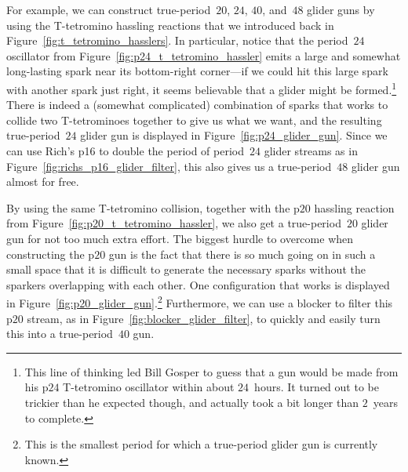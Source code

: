 For example, we can construct true-period~$20$, $24$, $40$, and~$48$ glider guns by using the T-tetromino hassling reactions that we introduced back in Figure~\ref{fig:t_tetromino_hasslers}. In particular, notice that the period~$24$ oscillator from Figure~\ref{fig:p24_t_tetromino_hassler} emits a large and somewhat long-lasting spark near its bottom-right corner---if we could hit this large spark with another spark just right, it seems believable that a glider might be formed.\footnote{This line of thinking led Bill Gosper to guess that a gun would be made from his p$24$ T-tetromino oscillator within about $24$~hours. It turned out to be trickier than he expected though, and actually took a bit longer than $2$~years to complete.} There is indeed a (somewhat complicated) combination of sparks that works to collide two T-tetrominoes together to give us what we want, and the resulting true-period~$24$ glider gun is displayed in Figure~\ref{fig:p24_glider_gun}. Since we can use Rich's p16 to double the period of period~$24$ glider streams as in Figure~\ref{fig:richs_p16_glider_filter}, this also gives us a true-period~$48$ glider gun almost for free.

By using the same T-tetromino collision, together with the p$20$ hassling reaction from Figure~\ref{fig:p20_t_tetromino_hassler}, we also get a true-period~$20$ glider gun for not too much extra effort. The biggest hurdle to overcome when constructing the p$20$ gun is the fact that there is so much going on in such a small space that it is difficult to generate the necessary sparks without the sparkers overlapping with each other. One configuration that works is displayed in Figure~\ref{fig:p20_glider_gun}.\footnote{This is the smallest period for which a true-period glider gun is currently known.} Furthermore, we can use a blocker to filter this p$20$ stream, as in Figure~\ref{fig:blocker_glider_filter}, to quickly and easily turn this into a true-period~$40$ gun.

